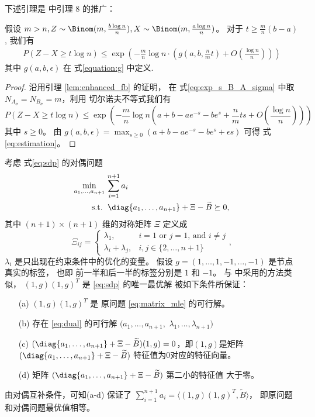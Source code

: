 下述引理是
\citet{abbe2015exact}
中引理 8 的推广：
\begin{lemma}\label{lem:zxt}
    假设 $m > n, Z \sim \Binom(m, \frac{b\log n}{n}), X\sim \Binom(m, \frac{a\log n}{n})$。
    对于 $ t \geq \frac{m}{n}(b - a)$, 我们有
    \begin{align}\label{eq:estimation}
        P(Z - X \geq t \log n) \leq \exp(-\frac{m}{n}\log n \cdot ( g(a, b, \frac{n}{m}t) + O(\frac{\log n}{n})))
    \end{align}
    其中 $g(a,b,\epsilon)$ 在 式\eqref{equation:g} 中定义.
\end{lemma}
\begin{proof}
    沿用引理 \ref{lem:enhanced_fb} 的证明，
在 式\eqref{eq:exp_s_B_A_sigma}
中取  $N_{A_{\bar{\sigma}}}
=N_{B_{\bar{\sigma}}}=m$，利用
切尔诺夫不等式我们有
\begin{equation*}
    P(Z - X \geq t \log n) \leq \exp(-\frac{m}{n}\log n (a+b-ae^{-s}-be^s+\frac{n}{m}ts + O(\frac{\log n}{n})))
\end{equation*}
其中 $s \geq 0$。
由 $g(a,b,\epsilon) = 
\max_{s \geq 0} (a+b-a e^{-s} - b e^s + \epsilon s)$
可得 式 \eqref{eq:estimation}。
\end{proof}
考虑 式\eqref{eq:sdp} 的对偶问题
\begin{align}
    \min_{a_1, \dots, a_{n+1}}\, &\sum_{i=1}^{n+1} a_i \nonumber\\
    \label{eq:dual}
    \textrm{s.t. } &\, \diag\{a_1, \dots, a_{n+1}\} + \Xi - \widetilde{B} \succeq 0, 
\end{align}
其中 $(n+1)\times (n+1)$ 维的对称矩阵
$\Xi$ 定义成 
\begin{equation}
    \Xi_{ij} = \begin{cases}
        \lambda_1, & i=1\text{ or }j=1 \text{, and }i\ne j\\
        \lambda_i + \lambda_j, & i, j\in\{2,\ldots,n+1\}
    \end{cases},
\end{equation}
$\lambda_i$ 是只出现在约束条件中的优化的变量。
假设 $g=(1,\ldots,1,-1,\ldots,-1)$ 是节点真实的标签，
也即
前一半和后一半的标签分别是  $1$ 和 $-1$。
与 \citet{abbe2015exact} 中采用的方法类似，
$(1,g)(1,g)^T$ 是 \eqref{eq:sdp} 的唯一最优解
 被如下条件所保证：
\begin{enumerate}
    \item[(a)] $(1,g)(1,g)^T$ 是 原问题 \eqref{eq:matrix_mle} 的可行解。
    \item[(b)] 存在 \eqref{eq:dual} 的可行解 $(a_1,\ldots,a_{n+1},$ $\lambda_1,\ldots,\lambda_{n+1})$ 
    \item[(c)] $(\diag\{a_1, \dots, a_{n+1}\} + \Xi - \widetilde{B})(1,g)=0$，即$(1,g)$是矩阵 $(\diag\{a_1, \dots, a_{n+1}\} + \Xi - \widetilde{B})$ 特征值为0对应的特征向量。
    \item[(d)]  矩阵 $(\diag\{a_1, \dots, a_{n+1}\} + \Xi - \widetilde{B})$ 第二小的特征值 大于零。 
\end{enumerate}
由对偶互补条件，可知(a-d) 保证了 
$\sum_{i=1}^{n+1} a_i=\langle(1,g)(1,g)^T,\widetilde{B} \rangle$，
即原问题和对偶问题最优值相等。

